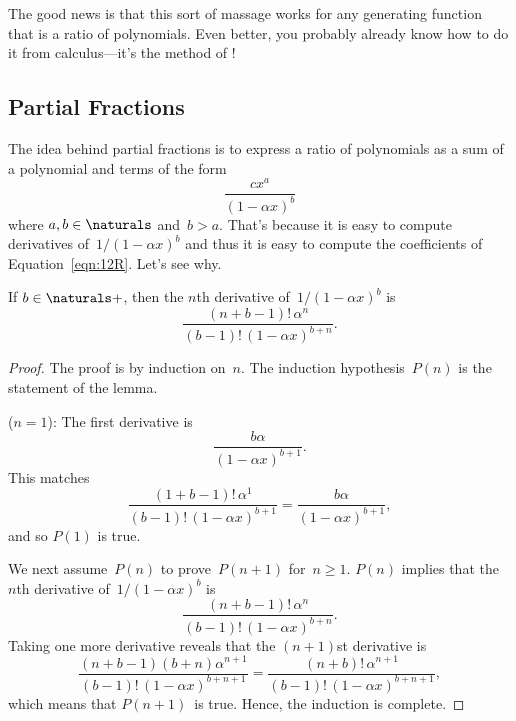 The good news is that this sort of massage works for any generating
function that is a ratio of polynomials.  Even better, you probably
already know how to do it from calculus---it's the method of
!

\subsection{Partial Fractions}\label{sec:partial_fractions}

The idea behind partial fractions is to express a ratio of polynomials
as a sum of a polynomial and terms of the form
\begin{equation}\label{eqn:12R}
    \frac{c x^a}{(1 - \alpha x)^b}
\end{equation}
where $a, b \in \naturals$ and~$b > a$.
That's because it is easy to compute derivatives of~$1/(1 - \alpha
x)^b$ and thus it is easy to compute the coefficients of
Equation~\ref{eqn:12R}.  Let's see why.

\begin{lemma}\label{lem:12A1}
If $b \in \naturals+$, then the $n$th derivative of~$1/(1 - \alpha
x)^b$ is
\begin{equation*}
    \frac{ (n + b - 1)! \, \alpha^n }{ (b - 1)! \, (1 - \alpha x)^{b + n} }.
\end{equation*}
\end{lemma}

\begin{proof}
The proof is by induction on~$n$.  The induction hypothesis~$P(n)$ is
the statement of the lemma.

 ($n = 1$): The first derivative is
\begin{equation*}
    \frac{b \alpha}{(1 - \alpha x)^{b + 1}}.
\end{equation*}
This matches
\begin{equation*}
    \frac{(1 + b - 1)!\, \alpha^1}{(b - 1)! \, (1 - \alpha x)^{b + 1}}
    = \frac{b \alpha}{(1 - \alpha x)^{b + 1}},
\end{equation*}
and so $P(1)$ is true.

We next assume~$P(n)$ to prove~$P(n + 1)$ for~$n \ge 1$.  $P(n)$
implies that the $n$th derivative of~$1/(1 - \alpha x)^b$ is
\begin{equation*}
    \frac{(n + b - 1)! \, \alpha^n}{(b - 1)! \, (1 - \alpha x)^{b + n}}.
\end{equation*}
Taking one more derivative reveals that the $(n + 1)$st derivative is
\begin{equation*}
\frac{ (n + b - 1) (b + n) \alpha^{n + 1} }
     { (b - 1)!\, (1 - \alpha x)^{b + n + 1} }
  =
\frac{ (n + b)! \, \alpha^{n + 1} }
     { (b - 1)! \, (1 - \alpha x)^{b + n + 1}},
\end{equation*}
which means that $P(n + 1)$~is true.  Hence, the induction is
complete.
\end{proof}


